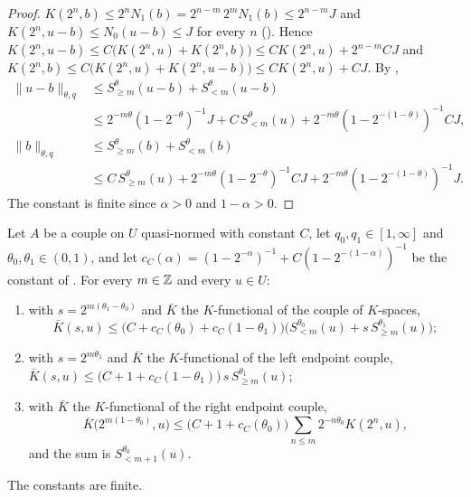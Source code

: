 \begin{proof}
\leanok
$K(2^n, b) \leq 2^n N_1(b) = 2^{n-m} \, 2^m N_1(b) \leq 2^{n-m} J$ and
$K(2^n, u - b) \leq N_0(u - b) \leq J$ for every $n$ (). Hence
$K(2^n, u - b) \leq C \bigl(K(2^n, u) + K(2^n, b)\bigr) \leq C K(2^n, u) + 2^{n-m} C J$ and
$K(2^n, b) \leq C \bigl(K(2^n, u) + K(2^n, u - b)\bigr) \leq C K(2^n, u) + C J$. By
,
\begin{align*}
  \|u - b\|_{\theta, q} &\leq S^{\theta}_{\geq m}(u - b) + S^{\theta}_{<m}(u - b) \\
  &\leq 2^{-m\theta} (1 - 2^{-\theta})^{-1} J + C \, S^{\theta}_{<m}(u)
    + 2^{-m\theta} (1 - 2^{-(1-\theta)})^{-1} C J , \\
  \|b\|_{\theta, q} &\leq S^{\theta}_{\geq m}(b) + S^{\theta}_{<m}(b) \\
  &\leq C \, S^{\theta}_{\geq m}(u) + 2^{-m\theta} (1 - 2^{-\theta})^{-1} C J
    + 2^{-m\theta} (1 - 2^{-(1-\theta)})^{-1} J .
\end{align*}
The constant is finite since $\alpha > 0$ and $1 - \alpha > 0$.
\end{proof}

\begin{theorem}
\label{thm:holmstedt}
\leanok
{}
Let $A$ be a couple on $U$ quasi-normed with constant $C$, let $q_0, q_1 \in [1, \infty]$ and
$\theta_0, \theta_1 \in (0, 1)$, and let
$c_C(\alpha) = (1 - 2^{-\alpha})^{-1} + C (1 - 2^{-(1-\alpha)})^{-1}$ be the constant of
. For every $m \in \mathbb{Z}$ and every $u \in U$:
\begin{enumerate}
  \item with $s = 2^{m(\theta_1 - \theta_0)}$ and $\bar K$ the $K$-functional of the couple of
    $K$-spaces,
    \[
      \bar K(s, u) \leq \bigl(C + c_C(\theta_0) + c_C(1 - \theta_1)\bigr)
      \bigl(S^{\theta_0}_{<m}(u) + s \, S^{\theta_1}_{\geq m}(u)\bigr) ;
    \]
  \item with $s = 2^{m\theta_1}$ and $\bar K$ the $K$-functional of the left endpoint couple,
    $\bar K(s, u) \leq \bigl(C + 1 + c_C(1 - \theta_1)\bigr) \, s \, S^{\theta_1}_{\geq m}(u)$;
  \item with $\bar K$ the $K$-functional of the right endpoint couple,
    \[
      \bar K\bigl(2^{m(1-\theta_0)}, u\bigr) \leq \bigl(C + 1 + c_C(\theta_0)\bigr)
      \sum_{n \leq m} 2^{-n\theta_0} K(2^n, u) ,
    \]
    and the sum is $S^{\theta_0}_{<m+1}(u)$.
\end{enumerate}
The constants are finite.
\end{theorem}

